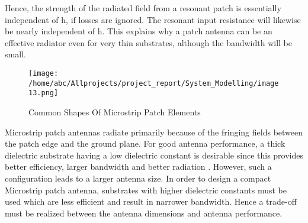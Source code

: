 \documentclass[12pt]{article}
\begin{document}
					                 Hence,  the  strength  of  the  radiated  field  from  a resonant patch is  essentially independent  of  h,  if  losses are ignored. The resonant input resistance will  likewise  be  nearly  independent  of  h.  This  explains  why  a  patch  antenna  can  be  an  effective radiator even for very thin substrates, although the bandwidth will be small.
					                 
					                \begin{figure}[H]
					                	\centering
					                	\texttt{[image: /home/abc/Allprojects/project\_report/System\_Modelling/image13.png]}
					                	\caption{Common Shapes Of Microstrip Patch Elements}	             	
					                \end{figure}
					                
					                 Microstrip patch antennas radiate primarily because of the fringing fields between the patch edge and the ground plane. For good antenna performance, a thick dielectric substrate having a low dielectric constant is desirable since this provides better efficiency, larger bandwidth and better radiation . However, such a configuration leads to a larger antenna size. In order to design a compact Microstrip patch antenna, substrates with higher dielectric constants must be used which are less efficient and result in narrower bandwidth. Hence a trade-off must be realized between the antenna dimensions and antenna performance.
					                
					                \cleardoublepage
					                
\end{document}
